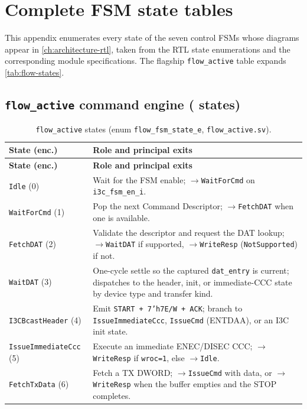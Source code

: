 \chapter{Complete FSM state tables}
\label{app:fsm-tables}

This appendix enumerates every state of the seven control FSMs whose diagrams appear in
\cref{ch:architecture-rtl}, taken from the RTL state enumerations and the corresponding
module specifications. The flagship \texttt{flow\_active} table expands
\cref{tab:flow-states}.

\section{\texttt{flow\_active} command engine (\FlowStateCount{} states)}

\begin{longtable}{@{}l>{\raggedright\arraybackslash}p{}@{}}
\caption{\texttt{flow\_active} states (enum \texttt{flow\_fsm\_state\_e}, \texttt{flow\_active.sv}).}
\label{tab:app-flow-states}\\
\toprule
\textbf{State (enc.)} & \textbf{Role and principal exits} \\
\midrule
\endfirsthead
\toprule
\textbf{State (enc.)} & \textbf{Role and principal exits} \\
\midrule
\endhead
\bottomrule
\endfoot
\texttt{Idle} (0)              & Wait for the FSM enable; $\to$\texttt{WaitForCmd} on \texttt{i3c\_fsm\_en\_i}. \\
\texttt{WaitForCmd} (1)        & Pop the next Command Descriptor; $\to$\texttt{FetchDAT} when one is available. \\
\texttt{FetchDAT} (2)          & Validate the descriptor and request the DAT lookup; $\to$\texttt{WaitDAT} if supported, $\to$\texttt{WriteResp} (\texttt{NotSupported}) if not. \\
\texttt{WaitDAT} (3)          & One-cycle settle so the captured \texttt{dat\_entry} is current; dispatches to the header, init, or immediate-CCC state by device type and transfer kind. \\
\texttt{I3CBcastHeader} (4)    & Emit \texttt{START + 7'h7E/W + ACK}; branch to \texttt{IssueImmediateCcc}, \texttt{IssueCmd} (ENTDAA), or an I3C init state. \\
\texttt{IssueImmediateCcc} (5) & Execute an immediate ENEC/DISEC CCC; $\to$\texttt{WriteResp} if \texttt{wroc=1}, else $\to$\texttt{Idle}. \\
\texttt{FetchTxData} (6)       & Fetch a TX DWORD; $\to$\texttt{IssueCmd} with data, or $\to$\texttt{WriteResp} when the buffer empties and the STOP completes. \\

\end{longtable}
